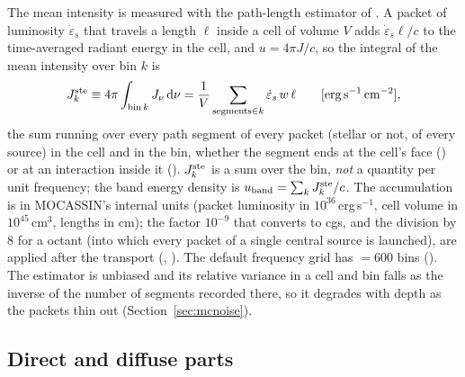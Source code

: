 The mean intensity is measured with the path-length estimator of
\citet[eq.~12]{Lucy1999}. A packet of luminosity $\dot\varepsilon_s$ that travels a
length $\ell$ inside a cell of volume $V$ adds $\dot\varepsilon_s\ell/c$ to the
time-averaged radiant energy in the cell, and $u=4\pi J/c$, so the integral of
the mean intensity over bin $k$ is
\begin{equation}
  J^{\mathrm{ste}}_k \equiv 4\pi\int_{\mathrm{bin}\,k} J_\nu\,\mathrm{d}\nu
          = \frac{1}{V}\sum_{\mathrm{segments}\in k} \dot\varepsilon_s\, w\,\ell
  \qquad [\mathrm{erg\,s^{-1}\,cm^{-2}}],
  \label{eq:estimator}
\end{equation}
the sum running over every path segment of every packet (stellar or not, of
every source) in the cell and in the bin, whether the segment ends at the
cell's face () or at an interaction
inside it (). $J^{\mathrm{ste}}_k$ is a sum over the bin, \emph{not}
a quantity per unit frequency; the band energy density is
$u_{\mathrm{band}}=\sum_k J^{\mathrm{ste}}_k/c$. The accumulation is in MOCASSIN's internal
units (packet luminosity in $10^{36}$\,erg\,s$^{-1}$, cell volume in
$10^{45}$\,cm$^3$, lengths in cm); the factor $10^{-9}$ that converts to cgs,
and the division by 8 for a  octant (into which every packet
of a single central source is launched), are applied after the transport
(, ). The default frequency grid
has  $=600$ bins (). The estimator is
unbiased and its relative variance in a cell and bin falls as the inverse of
the number of segments recorded there, so it degrades with depth as the
packets thin out (Section~\ref{sec:mcnoise}).

\subsection{Direct and diffuse parts}
\label{sec:split}

